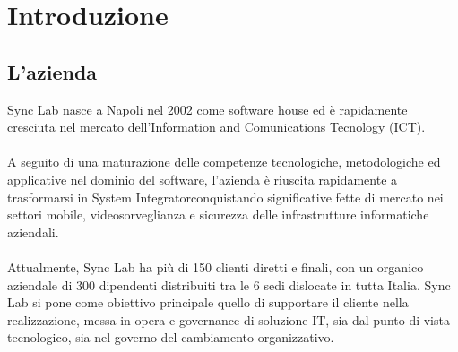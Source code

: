 
\chapter{Introduzione}
\label{cap:introduzione}





\section{L'azienda}

Sync Lab nasce a Napoli nel 2002 come software house ed è rapidamente cresciuta nel
mercato dell’Information and Comunications Tecnology (ICT). 
\\\\
A seguito di una
maturazione delle competenze tecnologiche, metodologiche ed applicative nel dominio
del software, l’azienda è riuscita rapidamente a trasformarsi in \gls{System Integrator}\glsfirstoccur conquistando 
significative fette di mercato nei settori mobile, videosorveglianza e sicurezza
delle infrastrutture informatiche aziendali. 
\\\\
Attualmente, Sync Lab ha più di 150 clienti
diretti e finali, con un organico aziendale di 300 dipendenti distribuiti tra le 6 sedi
dislocate in tutta Italia.
Sync Lab si pone come obiettivo principale quello di supportare il cliente nella realizzazione, 
messa in opera e governance di soluzione \gls{IT}\glsfirstoccur, sia dal punto di vista tecnologico,
sia nel governo del cambiamento organizzativo.

